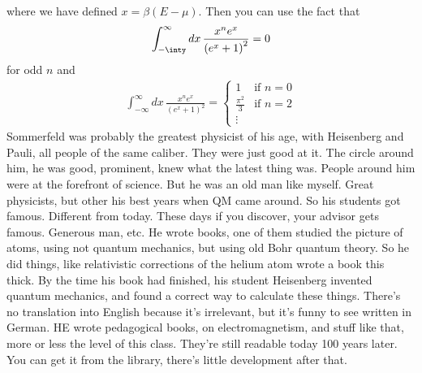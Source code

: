 where we have defined $x = \beta\left( E - \mu \right)$.
Then you can use the fact that
\begin{align}
    \int_{-\inty}^{\infty} dx\,
    \frac{x^n e^x}{\left( e^x + 1 \right)^2} = 0
\end{align}
for odd $n$
and
\begin{align}
    \int_{-\infty}^{\infty} dx\,
    \frac{x^{n} e^x}{\left( e^x + 1 \right)^2}
    =
    \begin{cases}
        1 & \text{if } n = 0\\
        \frac{\pi^2}{3} & \text{if } n = 2\\
        \vdots
    \end{cases}
\end{align}
Sommerfeld was probably the greatest physicist of his age,
with Heisenberg and Pauli,
all people of the same caliber.
They were just good at it.
The circle around him,
he was good,
prominent,
knew what the latest thing was.
People around him were at the forefront of science.
But he was an old man like myself.
Great physicists,
but other his best years when QM came around.
So his students got famous.
Different from today.
These days if you discover,
your advisor gets famous.
Generous man,
etc.
He wrote books,
one of them studied the picture of atoms,
using not quantum mechanics,
but using old Bohr quantum theory.
So he did things,
like relativistic corrections of the helium atom
wrote a book this thick.
By the time his book had finished,
his student Heisenberg invented quantum mechanics,
and found a correct way to calculate these things.
There's no translation into English because it's irrelevant,
but it's funny to see written in German.
HE wrote pedagogical books,
on electromagnetism, and stuff like that,
more or less the level of this class.
They're still readable today 100 years later.
You can get it from the library,
there's little development after that.

